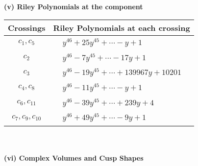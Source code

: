 \documentclass[1p]{elsarticle_modified}
\theoremstyle{definition}
\begin{document}
\newpage\renewcommand{\arraystretch}{1}
\flushleft \textbf{(v) Riley Polynomials at the component}\newline \\
\begin{tabular}{m{50pt}|m{274pt}}
Crossings & \hspace{64pt}Riley Polynomials at each crossing \\
\hline $$\begin{aligned}c_{1},c_{5}\end{aligned}$$&$\begin{aligned}
&y^{46}+25 y^{45}+\cdots- y+1
\end{aligned}$\\
\hline $$\begin{aligned}c_{2}\end{aligned}$$&$\begin{aligned}
&y^{46}-7 y^{45}+\cdots-17 y+1
\end{aligned}$\\
\hline $$\begin{aligned}c_{3}\end{aligned}$$&$\begin{aligned}
&y^{46}-19 y^{45}+\cdots+139967 y+10201
\end{aligned}$\\
\hline $$\begin{aligned}c_{4},c_{8}\end{aligned}$$&$\begin{aligned}
&y^{46}-11 y^{45}+\cdots- y+1
\end{aligned}$\\
\hline $$\begin{aligned}c_{6},c_{11}\end{aligned}$$&$\begin{aligned}
&y^{46}-39 y^{45}+\cdots+239 y+4
\end{aligned}$\\
\hline $$\begin{aligned}c_{7},c_{9},c_{10}\end{aligned}$$&$\begin{aligned}
&y^{46}+49 y^{45}+\cdots-9 y+1
\end{aligned}$\\
\hline
\end{tabular}\\~\\
\newpage\flushleft \textbf{(vi) Complex Volumes and Cusp Shapes}
\end{document}
